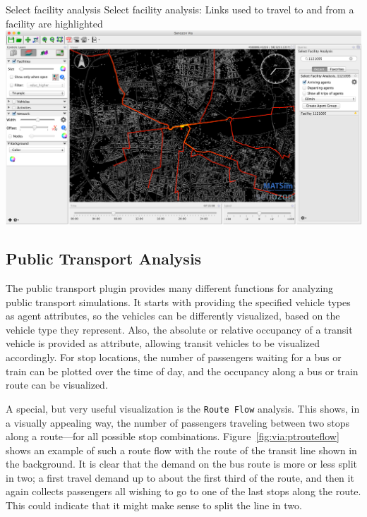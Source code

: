 \createfigure%
{Select facility analysis}%
{Select facility analysis: Links used to travel to and from a facility are highlighted}%
{\label{fig:via:selectFacilityAnalysis}}%
{\includegraphics[width=1.\textwidth,angle=0]{./extending/figures/via/selectFacilityAnalysis}}%
{}

\subsection{Public Transport Analysis}
The public transport plugin provides many different functions for analyzing
public transport simulations. It starts with providing the specified vehicle
types as agent attributes, so the vehicles can be differently visualized, based
on the vehicle type they represent. Also, the absolute or relative
occupancy of a transit vehicle is provided as attribute, allowing transit
vehicles to be visualized accordingly. For stop locations, the number of
passengers waiting for a bus or train can be plotted over the time of day, and
the occupancy along a bus or train route can be visualized.

A special, but very useful visualization is the \lstinline|Route Flow| analysis. This
shows, in a visually appealing way, the number of passengers traveling between
two stops along a route---for all possible stop combinations.
Figure~\ref{fig:via:ptrouteflow} shows an example of such a route flow with the
route of the transit line shown in the background.
It is clear that the demand on the bus route is more or less split in two; a
first travel demand up to about the first third of the route, and then it again
collects passengers all wishing to go to one of the last stops along the
route. This could indicate that it might make sense to split the line in two.

